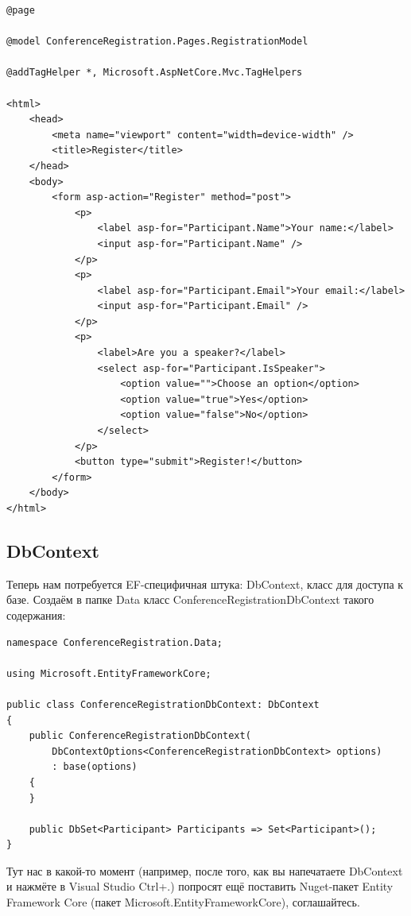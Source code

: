 \documentclass{../../text-style}
\begin{document}
\begin{verbatim}
@page

@model ConferenceRegistration.Pages.RegistrationModel

@addTagHelper *, Microsoft.AspNetCore.Mvc.TagHelpers

<html>
    <head>
        <meta name="viewport" content="width=device-width" />
        <title>Register</title>
    </head>
    <body>
        <form asp-action="Register" method="post">
            <p>
                <label asp-for="Participant.Name">Your name:</label>
                <input asp-for="Participant.Name" />
            </p>
            <p>
                <label asp-for="Participant.Email">Your email:</label>
                <input asp-for="Participant.Email" />
            </p>
            <p>
                <label>Are you a speaker?</label>
                <select asp-for="Participant.IsSpeaker">
                    <option value="">Choose an option</option>
                    <option value="true">Yes</option>
                    <option value="false">No</option>
                </select>
            </p>
            <button type="submit">Register!</button>
        </form>
    </body>
</html>
\end{verbatim}

\subsection{DbContext}

Теперь нам потребуется EF-специфичная штука: DbContext, класс для доступа к базе. Создаём в папке Data класс ConferenceRegistrationDbContext такого содержания:

\begin{verbatim}
namespace ConferenceRegistration.Data;

using Microsoft.EntityFrameworkCore;

public class ConferenceRegistrationDbContext: DbContext
{
    public ConferenceRegistrationDbContext(
        DbContextOptions<ConferenceRegistrationDbContext> options)
        : base(options)
    {
    }

    public DbSet<Participant> Participants => Set<Participant>();
}
\end{verbatim}

Тут нас в какой-то момент (например, после того, как вы напечатаете DbContext и нажмёте в Visual Studio Ctrl+.) попросят ещё поставить Nuget-пакет Entity Framework Core (пакет Microsoft.EntityFrameworkCore), соглашайтесь.
\end{document}
